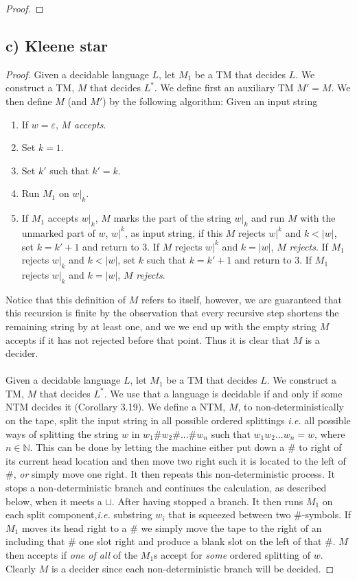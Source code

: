 \documentclass[a4paper,11pt]{article}
\newcommand{\abs}[1]{\left\lvert #1 \right\rvert}
\newcommand{\ie}{\emph{i.e.} }
\newcommand{\N}{\mathbb{N}}
\numberwithin{equation}{section}
\begin{document}
\begin{proof}
	\end{proof}
	\subsection*{c) Kleene star}
	\begin{proof}
			Given a decidable language $L$, let $M_1$ be a TM that decides $L$. We construct a TM, $M$ that decides $L^\ast$. We define first an auxiliary TM  $M'=M$. We then define $M$ (and $M'$) by the following algorithm: Given an input string\begin{enumerate}
				\item If $w=\varepsilon$, $ M $ \emph{accepts}.
				\item Set $k=1$.
				\item Set $k' $ such that $ k'=k $.
				\item Run $M_1$ on $w|_k$.
				\item If $M_1$ accepts $ w|_k $, $ M $ marks the part of the string $w|_k$ and run $M$ with the unmarked part of $w$, $w|^k$, as input string, if this $M$ rejects $w|^k$ and $k<\abs{w}$, set $k=k'+1$ and return to 3. If $M$ rejects $w|^k$ and $k=\abs{w}$, $ M $ \emph{rejects}. If $M_1$ rejects $w|_k$ and $k<\abs{w}$, set $k $ such that $k=k'+1$ and return to 3. If $M_1$ rejects $w|_k$ and $k=\abs{w}$, $M$ \emph{rejects}.
			\end{enumerate}
			Notice that this definition of $M$ refers to itself, however, we are guaranteed that this recursion is finite by the observation that every recursive step shortens the remaining string by at least one, and we we end up with the empty string $M$ accepts if it has not rejected before that point. Thus it is clear that $ M $ is a decider.\\
			\\
		Given a decidable language $L$, let $M_1$ be a TM that decides $L$. We construct a TM, $M$ that decides $L^\ast$. We use that a language is decidable if and only if some NTM decides it (Corollary 3.19). We define a NTM, $M$, to non-deterministically on the tape, split the input string in all possible ordered splittings \ie all possible ways of splitting the string $w$ in $w_1\#w_2\#...\#w_n$ such that $w_1w_2...w_n=w$, where $n\in\N$. This can be done by letting the machine either put down a $ \# $ to right of its current head location and then move two right such it is located to the left of $ \# $, \emph{or} simply move one right. It then repeats this non-deterministic process. It stops a non-deterministic branch and continues the calculation, as described below, when it meets a $ \sqcup $. After having stopped a branch.  It then runs $M_1$ on each split component,\ie substring $ w_i $ that is squeezed between two $\#$-symbols. If $M_1$ moves its head right to a $\#$ we simply move the tape to the right of an including that $\#$ one slot right and produce a blank slot on the left of that $ \# $. $M$ then accepts if \emph{one of all} of the $M_1$s accept for \emph{some} ordered splitting of $w$. Clearly $ M $ is a decider since each non-deterministic branch will be decided.
	\end{proof}
\end{document}
